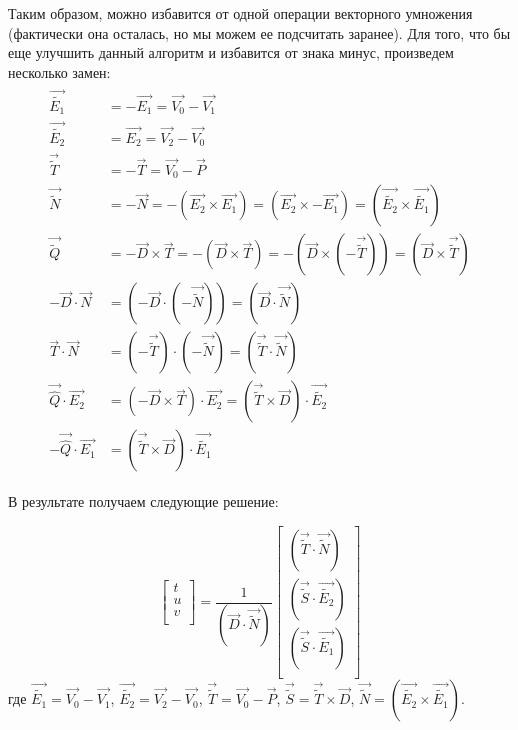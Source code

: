 \documentclass[12pt, a4paper, utf8]{article}
\begin{document}
Таким образом, можно избавится от одной операции векторного умножения (фактически она осталась, но мы можем ее подсчитать заранее). 
Для того, что бы еще улучшить данный алгоритм и избавится от знака минус, произведем несколько замен:
\begin{eqnarray*}
\begin{split}
\vec{\tilde {E_1}} &= -\vec{E_1} = \vec{V_0} - \vec{V_1}\\
\vec{\tilde {E_2}} &= \vec{E_2} = \vec{V_2} - \vec{V_0}\\
\vec{\tilde {T}} &= -\vec{T} = \vec{V_0} - \vec{P}\\
\vec{\tilde {N}} &= -\vec{N} = - (\vec{E_2} \times \vec{E_1}) = (\vec{E_2} \times -\vec{E_1}) = (\vec{\tilde {E_2}} \times \vec{\tilde{E_1}}) \\
\vec{ \tilde{ Q } } &= - \vec{D} \times \vec{T} = - ( \vec{D} \times \vec{T}) = - ( \vec{D} \times ( - \vec{\tilde{T}})) = ( \vec{D} \times \vec{\tilde{T}} ) \\
-\vec{D} \cdot \vec{N} &= (-\vec{D} \cdot (-\vec{\tilde{N}})) = (\vec{D} \cdot \vec{\tilde{N}}) \\
\vec{T} \cdot \vec{N} &= (-\vec{\tilde{T}}) \cdot (-\vec{\tilde{N}}) = (\vec{\tilde{T}} \cdot \vec{\tilde{N}}) \\
\vec{\hat{Q}} \cdot \vec{E_2} &= (-\vec{D} \times \vec{T}) \cdot \vec{E_2} = (\vec{\tilde{T}} \times \vec{D}) \cdot \vec{\tilde{E_2}} \\
-\vec{\hat{Q}} \cdot \vec{E_1} &= (\vec{\tilde{T}} \times \vec{D}) \cdot \vec{\tilde{E_1}}
\end{split}
\end{eqnarray*}

В результате получаем следующие решение:

\begin{equation}
\label{ray_cross_tr_solv_fin}
\left[  
\begin{array}{c} t \\ u \\ v \\ \end{array}
\right] = 
\frac{1}{(\vec{D} \cdot \vec{\tilde{N}})} 
\left[  
	\begin{array}{c}
	(\vec{\tilde{T}} \cdot \vec{\tilde{N}}) \\
	(\vec{\tilde{S}} \cdot \vec{\tilde{E_2}}) \\	
	(\vec{\tilde{S}} \cdot \vec{\tilde{E_1}}) \\	
	\end{array}
\right]
\end{equation}
где 
$\vec{\tilde {E_1}} = \vec{V_0} - \vec{V_1}$,
$\vec{\tilde {E_2}} = \vec{V_2} - \vec{V_0}$,
$\vec{\tilde {T}}  = \vec{V_0} - \vec{P}$,
$\vec{\tilde{S}} = \vec{\tilde{T}} \times \vec{D}$,
$\vec{\tilde {N}} = (\vec{\tilde {E_2}} \times \vec{\tilde{E_1}})$.
\end{document}
